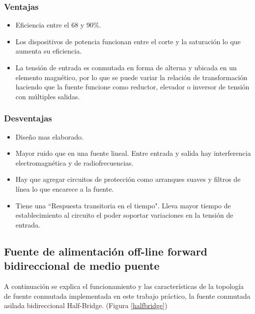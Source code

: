 \documentclass[11pt, a4paper]{article}
\begin{document}
\subsubsection{Ventajas}
\begin{itemize}
	\item Eficiencia entre el 68 y 90\%.
	\item Los dispositivos de potencia funcionan entre el corte y la saturación lo que aumenta su eficiencia.
	\item La tensión de entrada es conmutada en forma de alterna y ubicada en un elemento magnético, por lo que se puede variar la relación de transformación haciendo que la fuente funcione como reductor, elevador o inversor de tensión con múltiples salidas.
\end{itemize}
\subsubsection{Desventajas}
\begin{itemize}
	\item Diseño mas elaborado.
	\item Mayor ruido que en una fuente lineal. Entre entrada y salida hay interferencia electromagnética y de radiofrecuencias.
	\item Hay que agregar circuitos de protección como arranques suaves y filtros de línea lo que encarece a la fuente.
	\item Tiene una ``Respuesta transitoria en el tiempo". Lleva mayor tiempo de establecimiento al circuito el poder soportar variaciones en la tensión de entrada.
\end{itemize}

\subsection{Fuente de alimentación off-line forward bidireccional de medio puente}
A continuación se explica el funcionamiento y las características de la topología de fuente conmutada implementada en este trabajo práctico, la fuente conmutada asilada bidireccional Half-Bridge. (Figura \ref{halfbridge})
\end{document}
